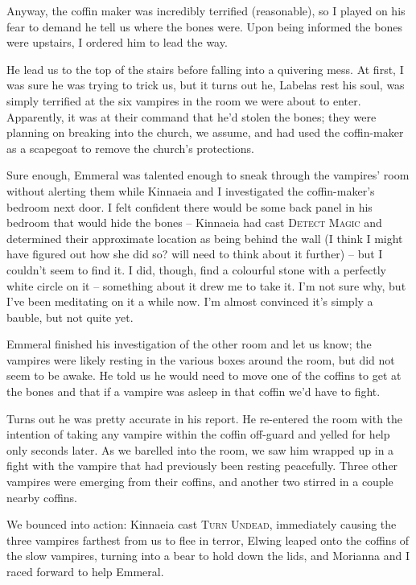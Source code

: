 Anyway, the coffin maker was incredibly terrified (reasonable), so I played on his fear to demand he tell us where the bones were. Upon being informed the bones were upstairs, I ordered him to lead the way.

He lead us to the top of the stairs before falling into a quivering mess. At first, I was sure he was trying to trick us, but it turns out he, Labelas rest his soul, was simply terrified at the six vampires in the room we were about to enter. Apparently, it was at their command that he'd stolen the bones; they were planning on breaking into the church, we assume, and had used the coffin-maker as a scapegoat to remove the church's protections.

Sure enough, Emmeral was talented enough to sneak through the vampires' room without alerting them while Kinnaeia and I investigated the coffin-maker's bedroom next door. I felt confident there would be some back panel in his bedroom that would hide the bones -- Kinnaeia had cast \textsc{Detect Magic} and determined their approximate location as being behind the wall (I think I might have figured out how she did so? will need to think about it further) -- but I couldn't seem to find it. I did, though, find a colourful stone with a perfectly white circle on it -- something about it drew me to take it. I'm not sure why, but I've been meditating on it a while now. I'm almost convinced it's simply a bauble, but not quite yet.

Emmeral finished his investigation of the other room and let us know; the vampires were likely resting in the various boxes around the room, but did not seem to be awake. He told us he would need to move one of the coffins to get at the bones and that if a vampire was asleep in that coffin we'd have to fight.

Turns out he was pretty accurate in his report. He re-entered the room with the intention of taking any vampire within the coffin off-guard and yelled for help only seconds later. As we barelled into the room, we saw him wrapped up in a fight with the vampire that had previously been resting peacefully. Three other vampires were emerging from their coffins, and another two stirred in a couple nearby coffins.

We bounced into action: Kinnaeia cast \textsc{Turn Undead}, immediately causing the three vampires farthest from us to flee in terror, Elwing leaped onto the coffins of the slow vampires, turning into a bear to hold down the lids, and Morianna and I raced forward to help Emmeral.


